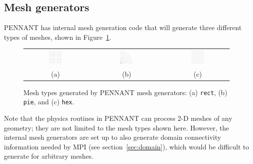 \documentclass[11pt,letterpaper]{article}
\begin{document}
\subsection{Mesh generators}

PENNANT has internal mesh generation code that will generate three
different types of meshes, shown in Figure~\ref{fig:meshtype}.
\begin{figure}
    \centering
    \begin{tabular}{ccccc}
    \includegraphics[width=0.25\textwidth]{rect-meshtype.png} &
    \hspace{0.025\textwidth} &
    \includegraphics[width=0.25\textwidth]{pie-meshtype.png} &
    \hspace{0.025\textwidth} &
    \includegraphics[width=0.25\textwidth]{hex-meshtype.png} \\
    (a) && (b) && (c) \\
    \end{tabular}
    \caption{Mesh types generated by PENNANT mesh generators:
    (a) {\tt rect}, (b) {\tt pie}, and (c) {\tt hex}.}
    \label{fig:meshtype}
\end{figure}

Note that the physics routines in PENNANT can process 2-D meshes of
any geometry; they are not limited to the mesh types shown here.
However, the internal mesh generators are set up to also generate domain
connectivity information needed by MPI (see section~\ref{sec:domain}),
which would be difficult to generate for arbitrary meshes.
\end{document}
